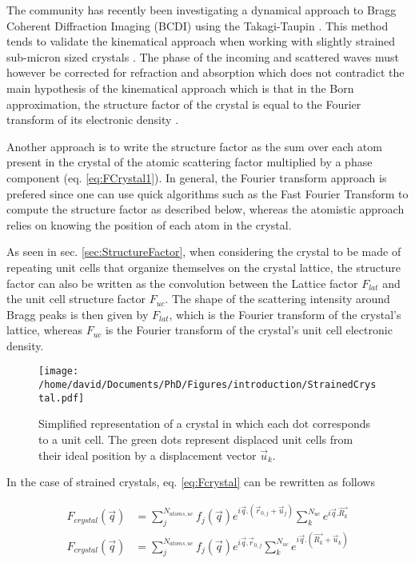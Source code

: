 The community has recently been investigating a dynamical approach to Bragg Coherent Diffraction Imaging (BCDI) \parencite{Yan2014, Shabalin2017, Hu2018, Gao2022} using the Takagi-Taupin \parencite{Takagi1962, Takagi1969}. This method tends to validate the kinematical approach when working with slightly strained sub-micron sized crystals \parencite{Karpov2019, Barringer2021}.
The phase of the incoming and scattered waves must however be corrected for refraction and absorption \parencite{Harder2007, Gao2022} which does not contradict the main hypothesis of the kinematical approach which is that in the Born approximation, the structure factor of the crystal is equal to the Fourier transform of its electronic density \parencite{Paganin}.

Another approach is to write the structure factor as the sum over each atom present in the crystal of the atomic scattering factor multiplied by a phase component (eq. \ref{eq:FCrystal1}).
In general, the Fourier transform approach is prefered since one can use quick algorithms such as the Fast Fourier Transform \parencite{Cooley1965, Cochran1967} to compute the structure factor as described below, whereas the atomistic approach relies on knowing the position of each atom in the crystal.

As seen in sec. \ref{sec:StructureFactor}, when considering the crystal to be made of repeating unit cells that organize themselves on the crystal lattice, the structure factor can also be written as the convolution between the Lattice factor $F_{lat}$ and the unit cell structure factor $F_{uc}$.
The shape of the scattering intensity around Bragg peaks is then given by $F_{lat}$, which is the Fourier transform of the crystal's lattice, whereas $F_{uc}$ is the Fourier transform of the crystal's unit cell electronic density.

\begin{figure}[!htb]
    \centering
    \texttt{[image: /home/david/Documents/PhD/Figures/introduction/StrainedCrystal.pdf]}
    \caption{
    Simplified representation of a crystal in which each dot corresponds to a unit cell.
    The green dots represent displaced unit cells from their ideal position by a displacement vector $\vec{u}_k$.
    }
    \label{fig:StrainedCrystals}
\end{figure}

In the case of strained crystals, eq. \ref{eq:Fcrystal} can be rewritten as follows

\begin{align}
    \label{eq:FcrystalBCDI1}
    F_{crystal}(\vec{q}) & = \sum_j^{N_{atoms, uc}} f_j(\vec{q}) e^{i\vec{q}.(\vec{r}_{0,j} + \vec{u}_{j})} \sum_k^{N_{uc}} e^{i\vec{q}.\vec{R_k}}\\
    \label{eq:FcrystalBCDI2}
    F_{crystal}(\vec{q}) & = \sum_j^{N_{atoms, uc}} f_j(\vec{q}) e^{i\vec{q}.\vec{r}_{0,j}} \sum_k^{N_{uc}} e^{i\vec{q}.(\vec{R_k} + \vec{u}_{k})}
\end{align}

